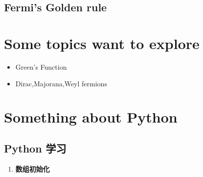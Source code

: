 \documentclass[letterpaper,10pt,english]{sphinxmanual}
\begin{document}
\section{Fermi's Golden rule}
\label{CMP/Fermi's_Golden_rule:id1}\label{CMP/Fermi's_Golden_rule::doc}\label{CMP/Fermi's_Golden_rule:fermi-s-golden-rule}

\chapter{Some topics want to explore}
\label{index:some-topics-want-to-explore}\begin{itemize}
\item {}
Green's Function

\item {}
Dirac,Majorana,Weyl fermions

\end{itemize}


\chapter{Something about Python}
\label{index:something-about-python}

\section{Python 学习}
\label{Python/note:python}\label{Python/note::doc}\label{Python/note:id1}\begin{enumerate}
\item {}
\textbf{数组初始化}

\end{enumerate}
\end{document}
